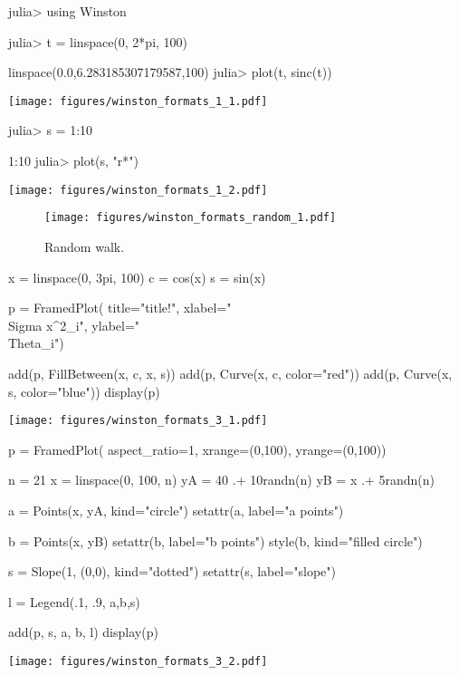 
\begin{juliaterm}
julia> using Winston

julia> t = linspace(0, 2*pi, 100)

linspace(0.0,6.283185307179587,100)
julia> plot(t, sinc(t))

\end{juliaterm}
\texttt{[image: figures/winston\_formats\_1\_1.pdf]}

\begin{juliaterm}
julia> s = 1:10

1:10
julia> plot(s, "r*")
\end{juliaterm}
\texttt{[image: figures/winston\_formats\_1\_2.pdf]}





\begin{figure}[htpb]
\center
\texttt{[image: figures/winston\_formats\_random\_1.pdf]}
\caption{Random walk.}
\label{fig:random}
\end{figure}




\begin{juliacode}
x = linspace(0, 3pi, 100)
c = cos(x)
s = sin(x)

p = FramedPlot(
         title="title!",
         xlabel="\\Sigma x^2_i",
         ylabel="\\Theta_i")

add(p, FillBetween(x, c, x, s))
add(p, Curve(x, c, color="red"))
add(p, Curve(x, s, color="blue"))
display(p)

\end{juliacode}
\texttt{[image: figures/winston\_formats\_3\_1.pdf]}

\begin{juliacode}

p = FramedPlot(
     aspect_ratio=1,
     xrange=(0,100),
     yrange=(0,100))

n = 21
x = linspace(0, 100, n)
yA = 40 .+ 10randn(n)
yB = x .+ 5randn(n)

a = Points(x, yA, kind="circle")
setattr(a, label="a points")

b = Points(x, yB)
setattr(b, label="b points")
style(b, kind="filled circle")

s = Slope(1, (0,0), kind="dotted")
setattr(s, label="slope")

l = Legend(.1, .9, {a,b,s})

add(p, s, a, b, l)
display(p)
\end{juliacode}
\texttt{[image: figures/winston\_formats\_3\_2.pdf]}
